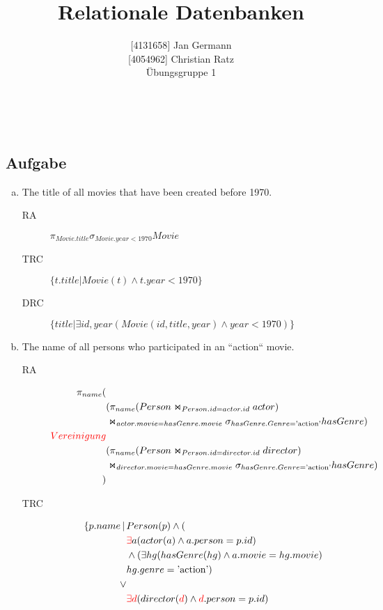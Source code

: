 \documentclass[11pt,a4paper,DIV=9]{scrartcl}
\author{{[}4131658{]} Jan Germann \\{[}4054962{]} Christian Ratz\\Übungsgruppe 1}
\title{Relationale Datenbanken}
\newcounter{temp}
\newcommand{\aufgabe}[1]{
  \setcounter{temp}{\value{subsection}}
  \setcounter{subsection}{#1}
  \addtocounter{subsection}{-1}
  \subsection{Aufgabe}
  \setcounter{subsection}{\value{temp}}
}
\renewcommand{\author}[1]{\renewcommand{\author}{#1}}
\renewcommand{\title}[1]{\renewcommand{\title}{#1}}
\newcommand{\makehomeworktitle}{
  \begin{minipage}[t]{6.5cm}
    \sf{\author}
  \end{minipage}
  \begin{minipage}[t]{6.5cm}
    \begin{flushright}
      \sf{\title\\\today}
    \end{flushright}
  \end{minipage}
  \\[0.2cm]
  \begin{center}
    \sf{
      \color{blue}{
        \LARGE{Aufgabenblatt \blattnr}
      }
    }
  \end{center}
  \vspace{0.1cm}
}
\begin{document}
\makehomeworktitle
\aufgabe{1}
  \begin{enumerate}[a)]
    \item The title of all movies that have been created before 1970.\hfill\\
      \begin{description}
        \item [RA]  $\pi_{Movie.title}\sigma_{Movie.year < 1970}Movie$
        \item [TRC] $ \{ t.title | Movie(t) \wedge t.year < 1970  \}$
        \item [DRC] $ \{ title | \exists id,year (Movie(id,title, year) \wedge year < 1970 )\}$
      \end{description}
    \item The name of all persons who participated in an ``action`` movie. \hfill\\
      \begin{description}
       \item [RA]  \begin{align*}
                        \pi_{name} (&\\
                            &(\pi_{name}(Person\Join_{Person.id = actor.id}actor)\\
                            &\Join_{actor.movie = hasGenre.movie}\sigma_{hasGenre.Genre=\textrm{'action'}}hasGenre)\\
                         \textcolor{red}{Vereinigung} &\\
                            &(\pi_{name}(Person\Join_{Person.id = director.id}director)\\
                            &\Join_{director.movie = hasGenre.movie}\sigma_{hasGenre.Genre=\textrm{'action'}}hasGenre)\\
                        )
                      \end{align*}
        \item [TRC] \begin{align*}
                    \{ p.name\,|\,& Person(p) \wedge ( \\
                        &\textcolor{red}{\exists} a (actor(a) \wedge a.person = p.id) \\
                        &\wedge ( \exists hg ( hasGenre(hg) \wedge a.movie=hg.movie) \\
                        &  hg.genre = \textrm{'action'}) \\
                        \vee & \\
                        &\textcolor{red}{\exists d} (director(\textcolor{red}{d}) \wedge \textcolor{red}{d}.person = p.id) \\

\end{align*}
\end{description}
\end{enumerate}
\end{document}

